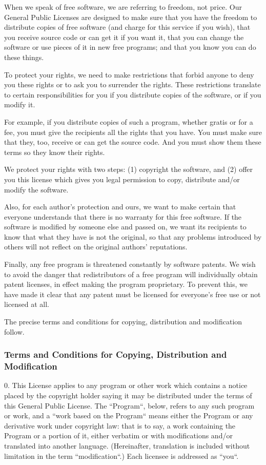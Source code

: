 \documentclass[a4paper, 11pt, twoside]{article}
\begin{document}
When we speak of free software, we are referring to freedom, not price. Our General Public Licenses are designed to make sure that you have the freedom to distribute copies of free software (and charge for this service if you wish), that you receive source code or can get it if you want it, that you can change the software or use pieces of it in new free programs; and that you know you can do these things.

To protect your rights, we need to make restrictions that forbid anyone to deny you these rights or to ask you to surrender the rights. These restrictions translate to certain responsibilities for you if you distribute copies of the software, or if you modify it.

For example, if you distribute copies of such a program, whether gratis or for a fee, you must give the recipients all the rights that you have. You must make sure that they, too, receive or can get the source code. And you must show them these terms so they know their rights.

We protect your rights with two steps: (1) copyright the software, and (2) offer you this license which gives you legal permission to copy, distribute and/or modify the software.

Also, for each author's protection and ours, we want to make certain that everyone understands that there is no warranty for this free software. If the software is modified by someone else and passed on, we want its recipients to know that what they have is not the original, so that any problems introduced by others will not reflect on the original authors' reputations.

Finally, any free program is threatened constantly by software patents. We wish to avoid the danger that redistributors of a free program will individually obtain patent licenses, in effect making the program proprietary. To prevent this, we have made it clear that any patent must be licensed for everyone's free use or not licensed at all.

The precise terms and conditions for copying, distribution and modification follow.

\subsubsection{Terms and Conditions for Copying, Distribution and Modification}

0. This License applies to any program or other work which contains a notice placed by the copyright holder saying it may be distributed under the terms of this General Public License. The “Program“, below, refers to any such program or work, and a “work based on the Program“ means either the Program or any derivative work under copyright law: that is to say, a work containing the Program or a portion of it, either verbatim or with modifications and/or translated into another language. (Hereinafter, translation is included without limitation in the term “modification“.) Each licensee is addressed as “you“.
\end{document}

